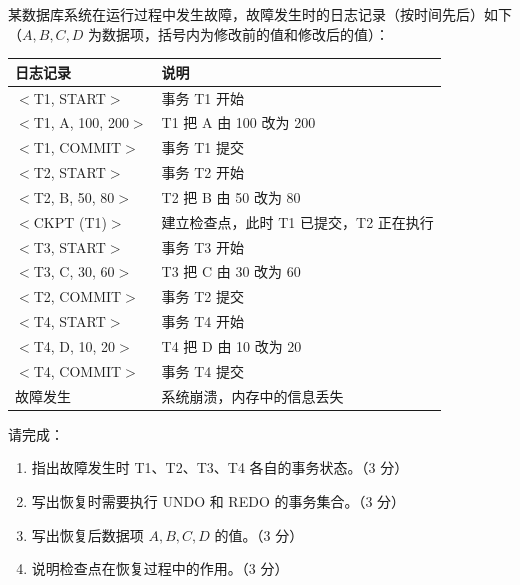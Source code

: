 \documentclass[a4paper,11pt]{article}
\begin{document}
\q 某数据库系统在运行过程中发生故障，故障发生时的日志记录（按时间先后）如下（$A,B,C,D$ 为数据项，括号内为修改前的值和修改后的值）：
\begin{center}
\small
\begin{tabular}{@{}ll@{}}
\toprule
日志记录 & 说明 \\
\midrule
$<$T1, START$>$ & 事务 T1 开始 \\
$<$T1, A, 100, 200$>$ & T1 把 A 由 100 改为 200 \\
$<$T1, COMMIT$>$ & 事务 T1 提交 \\
$<$T2, START$>$ & 事务 T2 开始 \\
$<$T2, B, 50, 80$>$ & T2 把 B 由 50 改为 80 \\
$<$CKPT (T1)$>$ & 建立检查点，此时 T1 已提交，T2 正在执行 \\
$<$T3, START$>$ & 事务 T3 开始 \\
$<$T3, C, 30, 60$>$ & T3 把 C 由 30 改为 60 \\
$<$T2, COMMIT$>$ & 事务 T2 提交 \\
$<$T4, START$>$ & 事务 T4 开始 \\
$<$T4, D, 10, 20$>$ & T4 把 D 由 10 改为 20 \\
$<$T4, COMMIT$>$ & 事务 T4 提交 \\
故障发生 & 系统崩溃，内存中的信息丢失 \\
\bottomrule
\end{tabular}
\end{center}

请完成：
\begin{enumerate}[label=（\arabic*）, leftmargin=2.4em, itemsep=1pt]
  \item 指出故障发生时 T1、T2、T3、T4 各自的事务状态。（3 分）
  \item 写出恢复时需要执行 UNDO 和 REDO 的事务集合。（3 分）
  \item 写出恢复后数据项 $A,B,C,D$ 的值。（3 分）
  \item 说明检查点在恢复过程中的作用。（3 分）
\end{enumerate}
\anslines{4.5cm}
\end{document}
